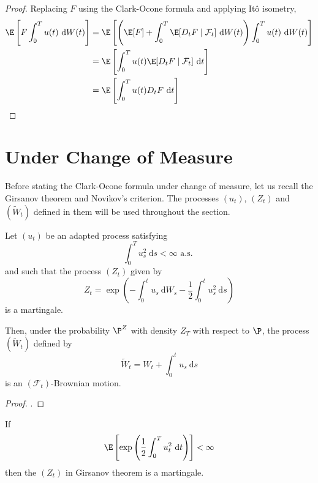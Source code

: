 \begin{proof}
	Replacing $F$ using the Clark-Ocone formula and applying Itô isometry,
		\begin{equation}
		\begin{aligned}
			\E\left[ F \int_0^T u(t) ~\mathrm{d}W(t) \right] &= \E\left[ \left( \E[F] + \int_0^T \E[D_t F \mid \mathcal{F}_t] ~\mathrm{d}W(t) \right) \int_0^T u(t) ~\mathrm{d}W(t) \right] \\ 
			&= \E\left[ \int_0^T u(t) \E[D_t F \mid \mathcal{F}_t] ~\mathrm{d}t \right] \\
			&= \E\left[ \int_0^T u(t) D_t F ~\mathrm{d}t \right]
		\end{aligned}
	\end{equation}
\end{proof}

\section{Under Change of Measure}\label{co-change-measure}

Before stating the Clark-Ocone formula under change of measure, let us recall the Girsanov theorem and Novikov's criterion. The processes $(u_t)$, $(Z_t)$ and $(\widetilde{W}_t)$ defined in them will be used throughout the section. 

\begin{theorem}[Girsanov]\label{thm:girsanov}
    Let $(u_t)$ be an adapted process satisfying 
    \[
        \int_0^T u_s^2 ~\mathrm{d}s < \infty \text{ a.s. }
    \]
    and such that the process $(Z_t)$ given by 
    \[
        Z_t = \exp \left(-\int_0^t u_s ~\mathrm{d}W_s - \frac{1}{2} \int_0^t u_s^2 ~\mathrm{d}s \right)
    \] 
    is a martingale. 

    Then, under the probability $\P^Z$ with density $Z_T$ with respect to $\P$, the process $(\widetilde{W}_t)$ defined by
    \[
        \widetilde{W}_t = W_t + \int_0^t u_s ~\mathrm{d}s
    \]
    is an $(\mathcal{F}_t)$-Brownian motion. 
\end{theorem}

\begin{proof}
    \cite[Theorem 5.2.3]{shreve2004stochastic}.
\end{proof}

\begin{remark}
    If 
    \[
        \E\left[ \exp \left( \frac{1}{2} \int_0^T u_t^2 ~\mathrm{d}t \right)\right] < \infty
    \]
    then the $(Z_t)$ in Girsanov theorem is a martingale.
\end{remark}

